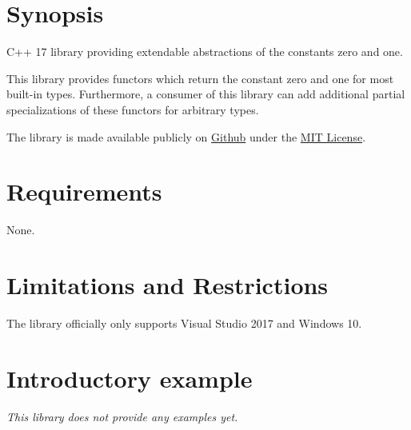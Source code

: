 \documentclass[oneside]{article}
\begin{document}
\maketitle
\tableofcontents
\section{Synopsis}
C++ 17 library providing extendable abstractions of the constants zero and one.\newline

\noindent{}This library provides functors which return the constant zero and one for most built-in types.
Furthermore, a consumer of this library can add additional partial specializations of these functors for arbitrary types.\newline

\noindent{}The library is made available publicly on
\href{\GetLibraryRepository}{Github}
under the
\href{\GetLibraryRepository/blob/master/LICENSE}{MIT License}.

\section{Requirements}
None.

\section{Limitations and Restrictions}
The library officially only supports Visual Studio 2017 and Windows 10.

\section{Introductory example}
\textit{\color{orange}This library does not provide any examples yet.}
\end{document}
